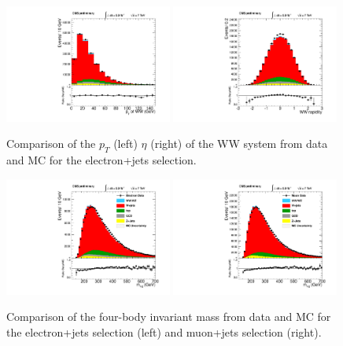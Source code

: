 
\begin{figure}[h!t]
  {\centering
    \includegraphics[width=0.49\textwidth]{plots/2012_DataMC/el_ptlvjj.pdf}
    \includegraphics[width=0.49\textwidth]{plots/2012_DataMC/el_etalvjj.pdf}
    \caption{Comparison of the $p_{T}$ (left) $\eta$ (right) of the WW system
      from data and MC for the electron+jets selection.}
\label{fig:elec_ww}}
\end{figure}

\begin{figure}[h!t]
  {\centering
    \includegraphics[width=0.49\textwidth]{plots/2012_DataMC/el_mlvjj.pdf}
    \includegraphics[width=0.49\textwidth]{plots/2012_DataMC/mu_mlvjj.pdf}
    \caption{Comparison of the four-body invariant mass from data and MC for the electron+jets selection (left) 
             and muon+jets selection (right).}
\label{fig:lep_mlvjj}}
\end{figure}


